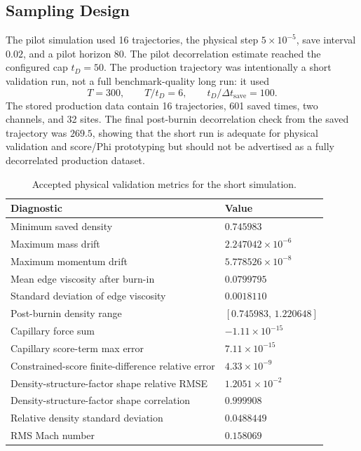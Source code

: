 \documentclass[11pt]{article}
\begin{document}
\subsection{Sampling Design}

The pilot simulation used 16 trajectories, the physical step \(5\times10^{-5}\), save interval \(0.02\), and a pilot horizon \(80\).  The pilot decorrelation estimate reached the configured cap \(t_D=50\).  The production trajectory was intentionally a short validation run, not a full benchmark-quality long run: it used
\begin{equation}
    T=300,\qquad T/t_D=6,\qquad t_D/\Delta t_{\mathrm{save}}=100.
\end{equation}
The stored production data contain 16 trajectories, 601 saved times, two channels, and 32 sites.  The final post-burnin decorrelation check from the saved trajectory was \(269.5\), showing that the short run is adequate for physical validation and score/Phi prototyping but should not be advertised as a fully decorrelated production dataset.

\begin{table}[tbp]
\centering
\caption{Accepted physical validation metrics for the short simulation.}
\label{tab:simulation_metrics}
\begin{tabular}{ll}
\toprule
Diagnostic & Value \\
\midrule
Minimum saved density & \(0.745983\) \\
Maximum mass drift & \(2.247042\times10^{-6}\) \\
Maximum momentum drift & \(5.778526\times10^{-8}\) \\
Mean edge viscosity after burn-in & \(0.0799795\) \\
Standard deviation of edge viscosity & \(0.0018110\) \\
Post-burnin density range & \([0.745983,\,1.220648]\) \\
Capillary force sum & \(-1.11\times10^{-15}\) \\
Capillary score-term max error & \(7.11\times10^{-15}\) \\
Constrained-score finite-difference relative error & \(4.33\times10^{-9}\) \\
Density-structure-factor shape relative RMSE & \(1.2051\times10^{-2}\) \\
Density-structure-factor shape correlation & \(0.999908\) \\
Relative density standard deviation & \(0.0488449\) \\
RMS Mach number & \(0.158069\) \\
\bottomrule
\end{tabular}
\end{table}
\end{document}
